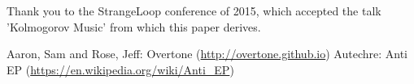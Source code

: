 \documentclass[numbers]{sigplanconf}
\begin{document}
\acks

Thank you to the StrangeLoop conference of 2015, which accepted the talk 'Kolmogorov Music' from which this paper derives.




\begin{thebibliography}{}
\softraggedright

 Aaron, Sam and Rose, Jeff: Overtone (\url{http://overtone.github.io})
 Autechre: Anti EP (\url{https://en.wikipedia.org/wiki/Anti_EP})

\end{thebibliography}
\end{document}
